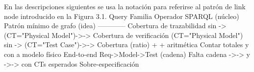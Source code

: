 {}En las descripciones siguientes se usa la notación  para referirse al patrón de link node introducido en la Figura 3.1.\markdownRendererInterblockSeparator
{}\markdownRendererInterblockSeparator
{}\markdownRendererPipe{} Query \markdownRendererPipe{} Familia \markdownRendererPipe{} Operador SPARQL (núcleo) \markdownRendererPipe{} Patrón mínimo de grafo (idea) \markdownRendererPipe{} \markdownRendererPipe{}---\markdownRendererPipe{}---\markdownRendererPipe{}---\markdownRendererPipe{}---\markdownRendererPipe{} \markdownRendererPipe{}  \markdownRendererPipe{} Cobertura de trazabilidad \markdownRendererPipe{}  \markdownRendererPipe{}  sin -> (CT="Physical Model")->-> \markdownRendererPipe{} \markdownRendererPipe{}  \markdownRendererPipe{} Cobertura de verificación \markdownRendererPipe{}  \markdownRendererPipe{}  (CT="Physical Model") sin -> (CT="Test Case")->-> \markdownRendererPipe{} \markdownRendererPipe{}  \markdownRendererPipe{} Cobertura (ratio) \markdownRendererPipe{}  +  + aritmética \markdownRendererPipe{} Contar  totales y  con  a modelo físico \markdownRendererPipe{} \markdownRendererPipe{}  \markdownRendererPipe{} End-to-end Req->Model->Test \markdownRendererPipe{}  (cadena) \markdownRendererPipe{} Falta cadena ->-> y ->-> con CTs esperados \markdownRendererPipe{} \markdownRendererPipe{}  \markdownRendererPipe{} Sobre-especificación \markdownRendererPipe{} 